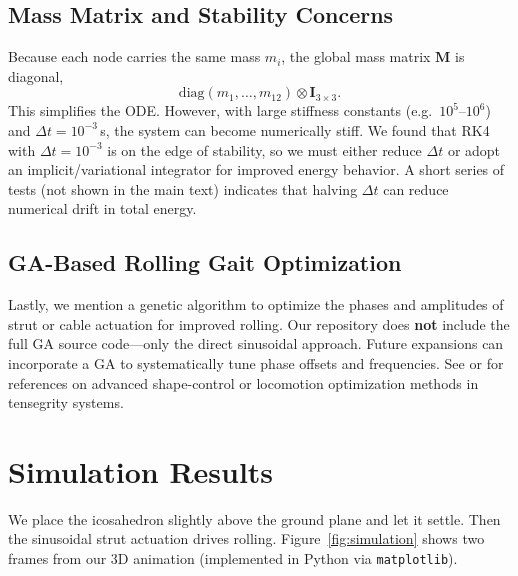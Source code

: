\documentclass[12pt,letterpaper]{article}
\newcommand{\Mass}{\mathbf{M}}
\begin{document}
\subsection{Mass Matrix and Stability Concerns}
Because each node carries the same mass $m_i$, the global mass matrix $\Mass$ is diagonal, $$\mathrm{diag}(m_1,\dots,m_{12}) \otimes \mathbf{I}_{3\times 3}.$$ This simplifies the ODE. However, with large stiffness constants (e.g.\ $10^5$--$10^6$) and $\Delta t=10^{-3}$\,s, the system can become numerically stiff. We found that RK4 with $\Delta t = 10^{-3}$ is on the edge of stability, so we must either reduce $\Delta t$ or adopt an implicit/variational integrator for improved energy behavior. A short series of tests (not shown in the main text) indicates that halving $\Delta t$ can reduce numerical drift in total energy.

\subsection{GA-Based Rolling Gait Optimization}
Lastly, we mention a genetic algorithm to optimize the phases and amplitudes of strut or cable actuation for improved rolling. Our repository does \textbf{not} include the full GA source code—only the direct sinusoidal approach. Future expansions can incorporate a GA to systematically tune phase offsets and frequencies. See \cite{ZhengCaiWang2020Rolling} or \cite{Cai2020} for references on advanced shape-control or locomotion optimization methods in tensegrity systems.

\section{Simulation Results}
We place the icosahedron slightly above the ground plane and let it settle.  Then the sinusoidal strut actuation drives rolling.  Figure~\ref{fig:simulation} shows two frames from our 3D animation (implemented in Python via \texttt{matplotlib}).
\end{document}
